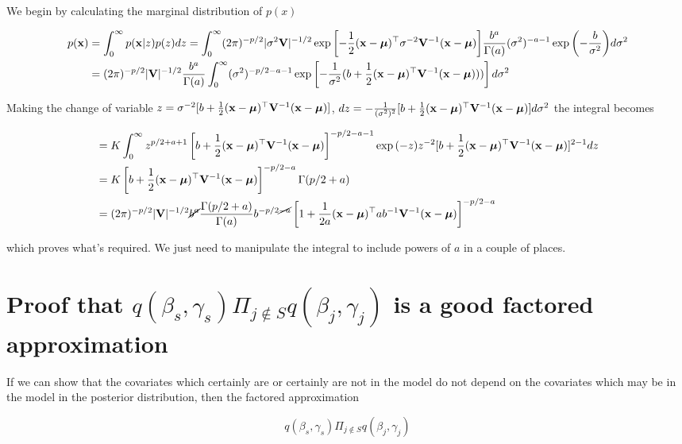 \documentclass{amsart}[12pt]
\theoremstyle{definition}
\begin{document}
We begin by calculating the marginal distribution of $p(x)$

\begin{align*}
	p({\bf x}) &= \int_0^\infty p({\bf x}|z) p(z) dz = \int_0^\infty (2 \pi)^{-p/2} |\sigma^2 {\bf V}|^{-1/2} 
					\exp{\left[-\frac{1}{2}({\bf x}- {\boldsymbol\mu})^\top \sigma^{-2} {\bf V}^{-1} ({\bf x}- {\boldsymbol\mu}) \right]} 
					\frac{b^a}{\Gamma(a)} (\sigma^2)^{-a-1} \exp{\left(-\frac{b}{\sigma^2}\right)} d \sigma^2 \\
			&= (2 \pi)^{-p/2} |{\bf V}|^{-1/2} \frac{b^a}{\Gamma(a)} \int_0^\infty (\sigma^2)^{-p/2-a-1} \exp \left[-\frac{1}{\sigma^2} (b + \frac{1}{2} ({\bf x} - {\boldsymbol \mu})^\top {\bf V}^{-1} ({\bf x} - {\boldsymbol \mu}))) \right] d \sigma^2
\end{align*}

Making the change of variable $z = \sigma^{-2}[b + \frac{1}{2}({\bf x} - {\boldsymbol \mu})^\top {\bf V}^{-1} ({\bf x} - {\boldsymbol \mu})]$,
$dz = - \frac{1}{(\sigma^2)^2} [b + \frac{1}{2} ({\bf x} - {\boldsymbol \mu})^\top {\bf V}^{-1} ({\bf x} - {\boldsymbol \mu})] d \sigma^2$
the integral becomes

\begin{align*}
	&= K \int_0^\infty z^{p/2 + a + 1} \left[b + \frac{1}{2} ({\bf x} - {\boldsymbol \mu})^\top {\bf V}^{-1} ({\bf x} - {\boldsymbol \mu})\right]^{-p/2 -a - 1}
			\exp{(-z)} z^{-2} [b + \frac{1}{2} ({\bf x} - {\boldsymbol \mu})^\top {\bf V}^{-1} ({\bf x} - {\boldsymbol \mu})]^{2-1} dz \\
	&= K \left[b + \frac{1}{2} ({\bf x} - {\boldsymbol \mu})^\top {\bf V}^{-1} ({\bf x} - {\boldsymbol \mu})\right]^{-p/2 - a} \Gamma(p/2 + a) \\
	&= (2 \pi)^{-p/2} |{\bf V}|^{-1/2} \cancel{b^a} \frac{\Gamma(p/2 + a)}{\Gamma(a)} b^{-p/2 \cancel{- a}} \left[ 1 + \frac{1}{2a} ({\bf x} - {\boldsymbol \mu})^\top a b^{-1} {\bf V}^{-1} ({\bf x} - {\boldsymbol \mu}) \right]^{-p/2 - a}
\end{align*}

which proves what's required. We just need to manipulate the integral to include powers of $a$
in a couple of places.

\section{Proof that $q(\beta_s, \gamma_s) \Pi_{j \notin S} q(\beta_j, \gamma_j)$ is a good factored approximation}

If we can show that the covariates which certainly are or certainly are not in the model do not depend on the
covariates which may be in the model in the posterior distribution, then the factored approximation

\[
	q(\beta_s, \gamma_s) \Pi_{j \notin S} q(\beta_j, \gamma_j)
\]
\end{document}
